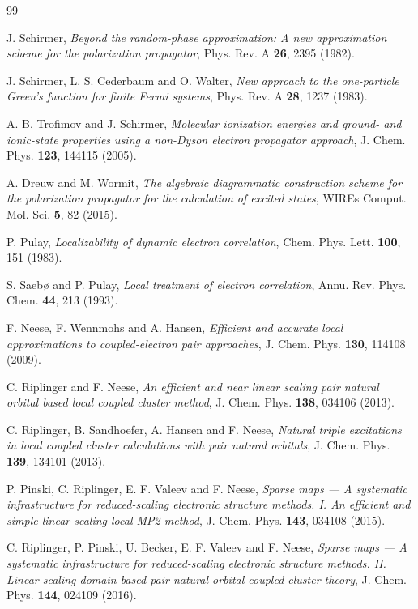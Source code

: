 \documentclass[aip,jcp,amsmath,amssymb,preprint,superscriptaddress]{revtex4-2}%
\begin{document}
\begin{thebibliography}{99}

 J. Schirmer,
  \emph{Beyond the random-phase approximation: A new approximation scheme for
  the polarization propagator}, Phys. Rev. A \textbf{26}, 2395 (1982).

 J. Schirmer, L. S. Cederbaum and O. Walter,
  \emph{New approach to the one-particle Green's function for finite Fermi
  systems}, Phys. Rev. A \textbf{28}, 1237 (1983).

 A. B. Trofimov and J. Schirmer,
  \emph{Molecular ionization energies and ground- and ionic-state properties
  using a non-Dyson electron propagator approach},
  J. Chem. Phys. \textbf{123}, 144115 (2005).

 A. Dreuw and M. Wormit,
  \emph{The algebraic diagrammatic construction scheme for the polarization
  propagator for the calculation of excited states},
  WIREs Comput. Mol. Sci. \textbf{5}, 82 (2015).

 P. Pulay,
  \emph{Localizability of dynamic electron correlation},
  Chem. Phys. Lett. \textbf{100}, 151 (1983).

 S. Saeb{\o} and P. Pulay,
  \emph{Local treatment of electron correlation},
  Annu. Rev. Phys. Chem. \textbf{44}, 213 (1993).

 F. Neese, F. Wennmohs and A. Hansen,
  \emph{Efficient and accurate local approximations to coupled-electron pair
  approaches}, J. Chem. Phys. \textbf{130}, 114108 (2009).

 C. Riplinger and F. Neese,
  \emph{An efficient and near linear scaling pair natural orbital based local
  coupled cluster method}, J. Chem. Phys. \textbf{138}, 034106 (2013).

 C. Riplinger, B. Sandhoefer, A. Hansen and F. Neese,
  \emph{Natural triple excitations in local coupled cluster calculations with
  pair natural orbitals}, J. Chem. Phys. \textbf{139}, 134101 (2013).

 P. Pinski, C. Riplinger, E. F. Valeev and F. Neese,
  \emph{Sparse maps --- A systematic infrastructure for reduced-scaling
  electronic structure methods. I. An efficient and simple linear scaling
  local MP2 method}, J. Chem. Phys. \textbf{143}, 034108 (2015).

 C. Riplinger, P. Pinski, U. Becker, E. F. Valeev and
  F. Neese, \emph{Sparse maps --- A systematic infrastructure for
  reduced-scaling electronic structure methods. II. Linear scaling domain
  based pair natural orbital coupled cluster theory},
  J. Chem. Phys. \textbf{144}, 024109 (2016).


\end{thebibliography}
\end{document}
